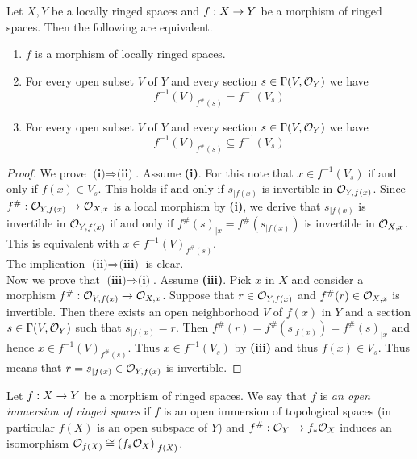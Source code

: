 \begin{fact}\label{fact:characterizationofmorphismsoflocallyringedspaces}
Let $X,Y$ be a locally ringed spaces and $f:X\rightarrow Y$ be a morphism of ringed spaces. Then the following are equivalent.
\begin{enumerate}[label=\emph{\textbf{(\roman*)}}, leftmargin=1.5em]
\item $f$ is a morphism of locally ringed spaces.
\item For every open subset $V$ of $Y$ and every section $s\in \Gamma(V,{\mathcal O}_Y)$ we have
$$f^{-1}\left(V\right)_{f^{\#}(s)} = f^{-1}(V_s)$$
\item For every open subset $V$ of $Y$ and every section $s\in \Gamma(V,{\mathcal O}_Y)$ we have
$$f^{-1}\left(V\right)_{f^{\#}(s)} \subseteq f^{-1}(V_s)$$
\end{enumerate}
\end{fact}
\begin{proof}
We prove $\textbf{(i)}\Rightarrow \textbf{(ii)}$. Assume \textbf{(i)}. For this note that $x\in f^{-1}(V_s)$ if and only if $f(x)\in V_s$. This holds if and only if $s_{\mid f(x)}$ is invertible in ${\mathcal O}_{Y,f(x)}$. Since $f^{\#}:{\mathcal O}_{Y,f(x)}\rightarrow {\mathcal O}_{X,x}$ is a local morphism by \textbf{(i)}, we derive that $s_{\mid f(x)}$ is invertible in ${\mathcal O}_{Y,f(x)}$ if and only if $f^{\#}(s)_{\mid x} = f^{\#}(s_{\mid f(x)})$ is invertible in ${\mathcal O}_{X,x}$. This is equivalent with $x\in f^{-1}(V)_{f^{\#}(s)}$.\\
The implication $\textbf{(ii)}\Rightarrow \textbf{(iii)}$ is clear.\\
Now we prove that $\textbf{(iii)}\Rightarrow \textbf{(i)}$. Assume \textbf{(iii)}. Pick $x$ in $X$ and consider a morphism $f^{\#}:{\mathcal O}_{Y,f(x)}\rightarrow {\mathcal O}_{X,x}$. Suppose that $r\in {\mathcal O}_{Y,f(x)}$ and $f^{\#}(r)\in {\mathcal O}_{X,x}$ is invertible. Then there exists an open neighborhood $V$ of $f(x)$ in $Y$ and a section $s\in \Gamma(V,{\mathcal O}_Y)$ such that $s_{\mid f(x)} = r$. Then $f^{\#}(r) = f^{\#}(s_{\mid f(x)}) = f^{\#}(s)_{\mid x}$ and hence $x\in f^{-1}(V)_{f^{\#}(s)}$. Thus $x\in f^{-1}(V_s)$ by \textbf{(iii)} and thus $f(x)\in V_s$. Thus means that $r = s_{\mid f(x)}\in {\mathcal O}_{Y,f(x)}$ is invertible.
\end{proof}

\begin{definition}
Let $f:X\rightarrow Y$ be a morphism of ringed spaces. We say that $f$ is \textit{an open immersion of ringed spaces} if $f$ is an open immersion of topological spaces (in particular $f(X)$ is an open subspace of $Y$) and $f^{\#}:{\mathcal O}_Y\rightarrow f_*{\mathcal O}_X$ induces an isomorphism ${\mathcal O}_{f(X)} \cong \left(f_*{\mathcal O}_X\right)_{\mid f(X)}$.
\end{definition}


